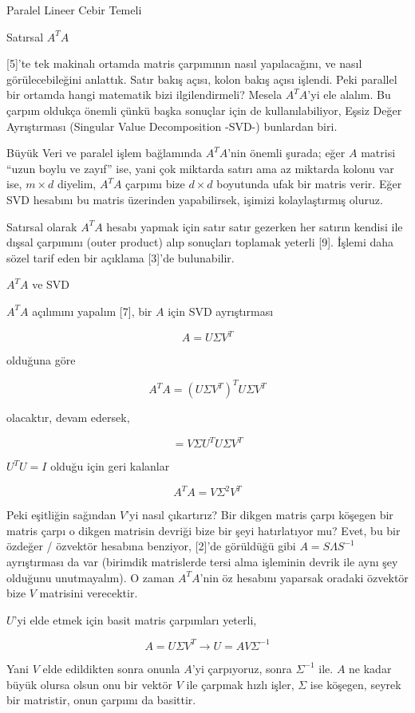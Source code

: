 \documentclass[12pt,fleqn]{article}\usepackage{../../common}
\begin{document}
Paralel Lineer Cebir Temeli

Satırsal $A^TA$

[5]'te tek makinalı ortamda matris çarpımının nasıl yapılacağını, ve nasıl
görülecebileğini anlattık. Satır bakış açısı, kolon bakış açısı işlendi. Peki
parallel bir ortamda hangi matematik bizi ilgilendirmeli? Mesela $A^TA$'yi ele
alalım. Bu çarpım oldukça önemli çünkü başka sonuçlar için de kullanılabiliyor,
Eşsiz Değer Ayrıştırması (Singular Value Decomposition -SVD-) bunlardan biri.

Büyük Veri ve paralel işlem bağlamında $A^TA$'nin önemli şurada; eğer $A$
matrisi ``uzun boylu ve zayıf'' ise, yani çok miktarda satırı ama az miktarda
kolonu var ise, $m \times d$ diyelim, $A^TA$ çarpımı bize $d \times d$ boyutunda
ufak bir matris verir. Eğer SVD hesabını bu matris üzerinden yapabilirsek,
işimizi kolaylaştırmış oluruz. 

Satırsal olarak $A^TA$ hesabı yapmak için satır satır gezerken her satırın
kendisi ile dışsal çarpımını (outer product) alıp sonuçları toplamak yeterli
[9]. İşlemi daha sözel tarif eden bir açıklama [3]'de bulunabilir.

$A^TA$ ve SVD

$A^TA$ açılımını yapalım [7], bir $A$ için SVD ayrıştırması

$$
A = U \Sigma V^T
$$

olduğuna göre

$$
A^TA =  (U \Sigma V^T)^T  U \Sigma V^T
$$

olacaktır, devam edersek,

$$
= V \Sigma U^T U \Sigma V^T 
$$

$U^T U = I$ olduğu için geri kalanlar

$$
A^TA = V \Sigma^2 V^T 
$$

Peki eşitliğin sağından $V$'yi nasıl çıkartırız? Bir dikgen matris çarpı köşegen
bir matris çarpı o dikgen matrisin devriği bize bir şeyi hatırlatıyor mu?  Evet,
bu bir özdeğer / özvektör hesabına benziyor, [2]'de görüldüğü gibi $A=S\Lambda
S^{-1}$ ayrıştırması da var (birimdik matrislerde tersi alma işleminin devrik
ile aynı şey olduğunu unutmayalım). O zaman $A^TA$'nin öz hesabını yaparsak
oradaki özvektör bize $V$ matrisini verecektir.

$U$'yi elde etmek için basit matris çarpımları yeterli,

$$
A = U \Sigma V^T \to U = A V \Sigma^{-1}
$$

Yani $V$ elde edildikten sonra onunla $A$'yi çarpıyoruz, sonra $\Sigma^{-1}$
ile. $A$ ne kadar büyük olursa olsun onu bir vektör $V$ ile çarpmak hızlı
işler, $\Sigma$ ise köşegen, seyrek bir matristir, onun çarpımı da basittir.
\end{document}
